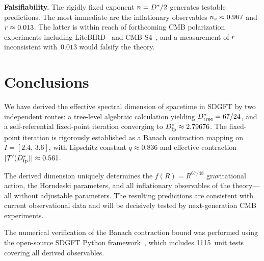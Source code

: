 \documentclass[amsmath,amssymb,aps,prd,twocolumn,superscriptaddress,nofootinbib]{revtex4-2}
\begin{document}
\textbf{Falsifiability.}\quad
The rigidly fixed exponent $n = D^{*}/2$ generates testable
predictions.  The most immediate are the inflationary observables
$n_s \approx 0.967$ and $r \approx 0.013$.  The latter is within
reach of forthcoming CMB polarization experiments including
LiteBIRD~\cite{LiteBIRD2023} and CMB-S4~\cite{CMBS4_2022}, and a
measurement of $r$ inconsistent with~$0.013$ would falsify the
theory.

\section{Conclusions}
\label{sec:conclusions}

We have derived the effective spectral dimension of spacetime in
SDGFT by two independent routes: a tree-level algebraic calculation
yielding $D^{*}_{\mathrm{tree}} = 67/24$, and a self-referential fixed-point
iteration converging to $D^{*}_{\mathrm{fp}} \approx 2.79676$.  The
fixed-point iteration is rigorously established as a Banach
contraction mapping on $I = [2.4,\,3.6]$, with Lipschitz constant
$q \approx 0.836$ and effective contraction
$\lvert\mathcal{T}'(D^{*}_{\mathrm{fp}})\rvert \approx 0.561$.

The derived dimension uniquely determines the $f(R) = R^{67/48}$
gravitational action, the Horndeski parameters, and all inflationary
observables of the theory---all without adjustable parameters.  The
resulting predictions are consistent with current observational data
and will be decisively tested by next-generation CMB experiments.

\begin{acknowledgments}
The numerical verification of the Banach contraction bound was
performed using the open-source SDGFT Python
framework~\cite{Goldstein_Code}, which includes 1115~unit tests
covering all derived observables.
\end{acknowledgments}
\end{document}

